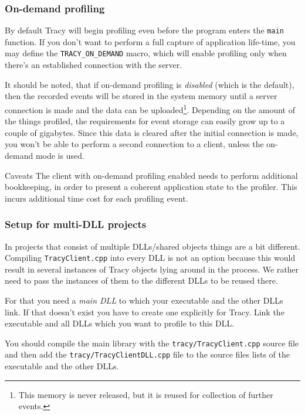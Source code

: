 \documentclass[hidelinks,titlepage,a4paper]{article}
\begin{document}
\subsubsection{On-demand profiling}
\label{ondemand}

By default Tracy will begin profiling even before the program enters the \texttt{main} function. If you don't want to perform a full capture of application life-time, you may define the \texttt{TRACY\_ON\_DEMAND} macro, which will enable profiling only when there's an established connection with the server.

It should be noted, that if on-demand profiling is \emph{disabled} (which is the default), then the recorded events will be stored in the system memory until a server connection is made and the data can be uploaded\footnote{This memory is never released, but it is reused for collection of further events.}. Depending on the amount of the things profiled, the requirements for event storage can easily grow up to a couple of gigabytes. Since this data is cleared after the initial connection is made, you won't be able to perform a second connection to a client, unless the on-demand mode is used.

\begin{bclogo}[
noborder=true,
couleur=black!5,
logo=\bcattention
]{Caveats}
The client with on-demand profiling enabled needs to perform additional bookkeeping, in order to present a coherent application state to the profiler. This incurs additional time cost for each profiling event.
\end{bclogo}

\subsubsection{Setup for multi-DLL projects}

In projects that consist of multiple DLLs/shared objects things are a bit different. Compiling \texttt{TracyClient.cpp} into every DLL is not an option because this would result in several instances of Tracy objects lying around in the process. We rather need to pass the instances of them to the different DLLs to be reused there.

For that you need a \emph{main DLL} to which your executable and the other DLLs link. If that doesn't exist you have to create one explicitly for Tracy. Link the executable and all DLLs which you want to profile to this DLL.

You should compile the main library with the \texttt{tracy/TracyClient.cpp} source file and then add the \texttt{tracy/TracyClientDLL.cpp} file to the source files lists of the executable and the other DLLs.
\end{document}
